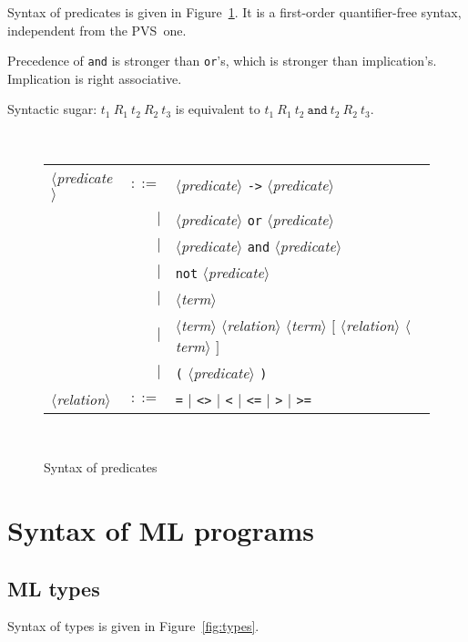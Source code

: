 \documentclass[a4paper,12pt]{report}
\newcommand{\pvs}{\textsf{PVS}}
\newcommand{\te}[1]{\texttt{#1}}
\newcommand{\nt}[1]{$\langle$\textsl{#1}$\rangle$}
\begin{document}
Syntax of predicates is given in Figure~\ref{fig:predicates}.
It is a first-order quantifier-free syntax, independent from the \pvs\ one.

Precedence of \te{and} is stronger than \te{or}'s, which is
stronger than implication's. Implication is right associative.

Syntactic sugar: $t_1 ~ R_1 ~ t_2 ~ R_2 ~ t_3$ is equivalent to
$t_1 ~ R_1 ~ t_2 ~ \texttt{and} ~ t_2 ~ R_2 ~ t_3$.

\begin{figure}[htbp]
\begin{center}
\hrulefill\\
\begin{tabular}{lrl}
  \nt{predicate}
    & $::=$ & \nt{predicate} \te{->} \nt{predicate} \\
      & $|$ & \nt{predicate} \te{or} \nt{predicate} \\
      & $|$ & \nt{predicate} \te{and} \nt{predicate} \\
      & $|$ & \te{not} \nt{predicate} \\
      & $|$ & \nt{term} \\
      & $|$ & \nt{term} \nt{relation} \nt{term} 
              $[$ \nt{relation} \nt{term} $]$ \\
      & $|$ & \te{(} \nt{predicate} \te{)}
  \\[0.1em]

  \nt{relation}
    & $::=$ & \te{=} $|$ \te{<>} $|$ 
              \te{<} $|$ \te{<=} $|$ \te{>} $|$ \te{>=}
\end{tabular}\\
\hrulefill
\caption{Syntax of predicates}
\label{fig:predicates}
\end{center}            
\end{figure}


\section{Syntax of ML programs}

\subsection{ML types}

Syntax of types is given in Figure~\ref{fig:types}.
\end{document}
